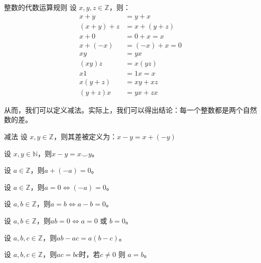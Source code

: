 \begin{theorem}{整数的代数运算规则}{}
	设 $x,y,z\in \mathbb Z$，则：
	$$
	\begin{aligned}
		x+y & = y + x\\
		(x+y)+z & = x + (y+z)\\
		x + 0 & = 0 + x = x\\
		x + (-x) & = (-x) + x = 0\\
		xy & = yx\\
		(xy)z & = x(yz)\\
		x1 & =1x=x\\
		x(y+z) &=xy+xz\\
		(y+z)x & = yx + zx
	\end{aligned}
	$$
\end{theorem}

从而，我们可以定义减法。实际上，我们可以得出结论：每一个整数都是两个自然数的差。

\begin{definition}{减法}{}
	设 $x, y\in \mathbb Z$，则其差被定义为：$x-y= x+(-y)$
\end{definition}

\begin{proposition}{}{}
	设 $x,y\in \mathbb N$，则$x-y=x\smile y$。
\end{proposition}

\begin{proposition}{}{}
	设 $a\in \mathbb Z$，则$a + (-a) = 0$。
\end{proposition}

\begin{proposition}{}{}
	设 $a\in \mathbb Z$，则$a = 0 \iff (-a) = 0$。
\end{proposition}

\begin{proposition}{}{}
	设 $a,b\in \mathbb Z$，则$a=b\iff a-b = 0$。
\end{proposition}

\begin{proposition}{}{}
	设 $a,b\in \mathbb Z$，则$ab=0 \iff a = 0$ 或 $b=0$。
\end{proposition}

\begin{proposition}{}{}
	设 $a,b, c\in \mathbb Z$，则$ab-ac=a(b-c)$。
\end{proposition}

\begin{proposition}{}{}
	设 $a,b, c\in \mathbb Z$，则$ac=bc$时，若$c\ne 0$ 则 $a=b$。
\end{proposition}

